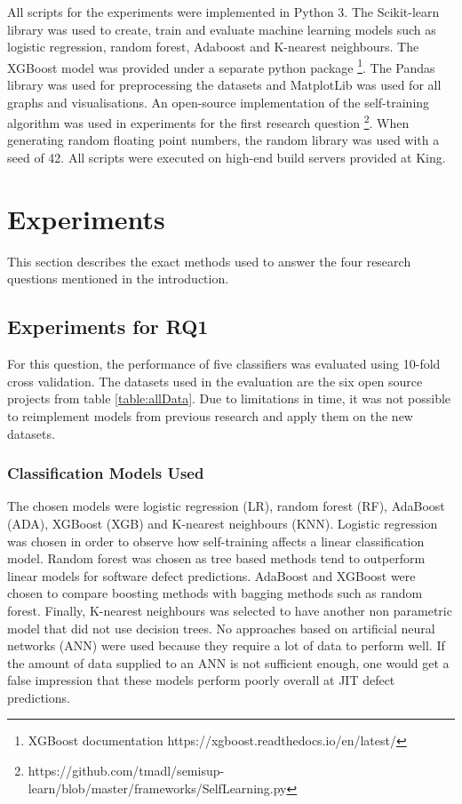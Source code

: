 \documentclass[../main.tex]{subfiles}
\begin{document}
All scripts for the experiments were implemented in Python 3. The Scikit-learn library was used to create, train and evaluate machine learning models such as logistic regression, random forest, Adaboost and K-nearest neighbours. The XGBoost model was provided under a separate python package \footnote{XGBoost documentation https://xgboost.readthedocs.io/en/latest/}. The Pandas library was used for preprocessing the datasets and MatplotLib was used for all graphs and visualisations. An open-source implementation of the self-training algorithm was used in experiments for the first research question \footnote{https://github.com/tmadl/semisup-learn/blob/master/frameworks/SelfLearning.py}. When generating random floating point numbers, the random library was used with a seed of 42. All scripts were executed on high-end build servers provided at King. 

\section{Experiments}

This section describes the exact methods used to answer the four research questions mentioned in the introduction. 

\subsection{Experiments for RQ1}

For this question, the performance of five classifiers was evaluated using 10-fold cross validation. The datasets used in the evaluation are the six open source projects from table \ref{table:allData}. Due to limitations in time, it was not possible to reimplement models from previous research and apply them on the new datasets. 

\subsubsection{Classification Models Used}

The chosen models were logistic regression (LR), random forest (RF), AdaBoost (ADA), XGBoost (XGB) and K-nearest neighbours (KNN). Logistic regression was chosen in order to observe how self-training affects a linear classification model. Random forest was chosen as tree based methods tend to outperform linear models for software defect predictions. AdaBoost and XGBoost were chosen to compare boosting methods with bagging methods such as random forest. Finally, K-nearest neighbours was selected to have another non parametric model that did not use decision trees. No approaches based on artificial neural networks (ANN) were used because they require a lot of data to perform well. If the amount of data supplied to an ANN is not sufficient enough, one would get a false impression that these models perform poorly overall at JIT defect predictions.
\end{document}
